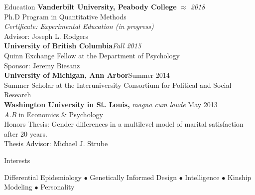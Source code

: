 \documentclass {resume}
\begin{document}
\nonfrenchspacing
\thispagestyle{myheadings}
\markright{\em{\textrm \today}}

\begin{rSection}{\textrm{Education}}
{\bf Vanderbilt University, Peabody College } \hfill  {\em $\approx$ 2018} \\
Ph.D Program in Quantitative Methods %
\\
\hspace* {3 mm}\textit{Certificate: Experimental Education (in progress)}\\
\hspace* {3 mm}Advisor: Joseph L. Rodgers\medskip\\
\textbf{University of British Columbia}\hfill \textit{Fall 2015}\\ 
Quinn Exchange Fellow at the Department of Psychology\\
\hspace* {3 mm} Sponsor: Jeremy Biesanz\medskip\\
\textbf{University of Michigan, Ann Arbor}\hfill Summer 2014\\ 
Summer Scholar at the Interuniversity Consortium for Political and Social Research\medskip\\
{\bf Washington University in St. Louis, }\textit{magna cum laude} \hfill  {May 2013} \\ 
{\em A.B} in Economics \& Psychology\\
\hspace* {3 mm}Honors Thesis: Gender differences in a multilevel model of marital satisfaction after 20 years.  \\
\hspace* {3 mm}Thesis Advisor: Michael J. Strube%

\end{rSection}
\begin{rSection}{\textrm{Interests}} \begin{center}Differential Epidemiology $\bullet$ Genetically Informed Design $\bullet$ Intelligence $\bullet$ Kinship Modeling $\bullet$ Personality\end{center}
\end{rSection}
\end{document}
